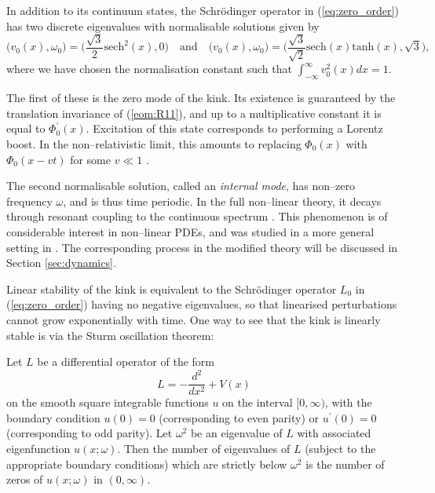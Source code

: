 
In addition to its continuum states, the Schr\"odinger operator in (\ref{eq:zero_order}) has two discrete eigenvalues with normalisable solutions given by
\begin{equation}
\label{eq:flat_vib_modes}
\big(v_0(x),\omega_0\big) = \bigg(\frac{\sqrt{3}}{2}\mathrm{sech}^2(x),0\bigg) \quad \mathrm{and} \quad
\big(v_0(x),\omega_0\big) = \bigg(\frac{\sqrt{3}}{\sqrt{2}}\mathrm{sech}(x)\mathrm{tanh}(x),\sqrt{3}\bigg),
\end{equation}
where we have chosen the normalisation constant such that $\int_{-\infty}^{\infty}v_0^2(x)dx=1$.

The first of these is the zero mode of the kink. Its existence is guaranteed by the translation invariance of (\ref{eom:R11}), and up to a multiplicative constant it is equal to $\Phi_0^\prime(x)$. Excitation of this state corresponds to performing a Lorentz boost. In the non--relativistic limit, this amounts to replacing $\Phi_0(x)$ with $\Phi_0(x-vt)$ for some $v\ll 1$ \cite{Manton&Sutcliffe}.

The second normalisable solution, called an \textit{internal mode}, has non--zero frequency $\omega$, and is thus time periodic. In the full non--linear theory, it decays through resonant coupling to the continuous spectrum \cite{Manton&Merabet}. This phenomenon is of considerable interest in non--linear PDEs, and was studied in a more general setting in \cite{SW98}. The corresponding process in the modified theory will be discussed in Section \ref{sec:dynamics}.

Linear stability of the kink is equivalent to the Schr\"odinger operator $L_0$ in (\ref{eq:zero_order}) having no negative eigenvalues, so that linearised perturbations cannot grow exponentially with time. One way to see that the kink is linearly stable is via the Sturm oscillation theorem:

\begin{theo}[Sturm]\label{th:sturm} Let $L$ be a differential operator of the form
\[
L=-\frac{d^2}{dx^2}+V(x)
\]
on the smooth square integrable functions $u$ on the interval $[0,\infty)$, with the boundary condition $u(0)=0$ (corresponding to even parity) or $u^\prime(0)=0$ (corresponding to odd parity). Let $\omega^2$ be an eigenvalue of $L$ with associated eigenfunction $u(x;\omega)$. Then the number of eigenvalues of $L$ (subject to the appropriate boundary conditions) which are strictly below $\omega^2$ is the number of zeros of $u(x;\omega)$ in $(0,\infty)$.
\end{theo}

